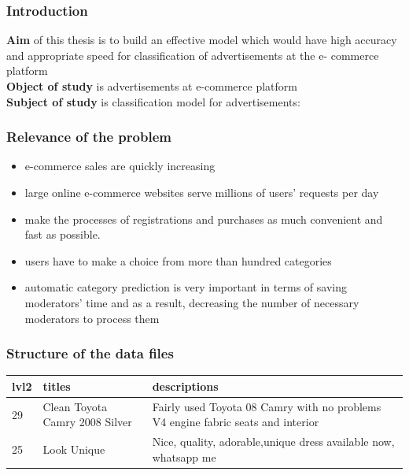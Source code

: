 \documentclass[14pt]{beamer}
\title{\small{\thesisTitle}}
\author{
		\thesisOrganizationLong\\
		\emph{Speaker:}~\thesisAuthorShort\\%
		\emph{Supervisor:}~\supervisorRegaliaShort~\supervisorFioShort\\%
	}
\date{\small{\thesisCity, \thesisYear}}
\begin{document}
		
		\maketitle

				
		\begin{frame}
			\frametitle{Introduction}
			{\textbf{Aim}} of this thesis is to build an effective model which would have
			high accuracy and appropriate speed for classification of advertisements at the e-
			commerce platform\\ 
			\textbf{Object of study} is advertisements at e-commerce platform 
			\\
			\textbf{Subject of study} is classification model for advertisements: 	
		\end{frame}
		
		\begin{frame}
			\frametitle{Relevance of the problem}
				\begin{itemize}
					\item e-commerce sales are quickly increasing
					\item large online e-commerce websites serve millions of users’ requests per day
					\item make the processes of registrations and purchases as
					much convenient and fast as possible.
					\item users have to make a choice from more than hundred categories
					\item  automatic category prediction is very important in terms of saving moderators' time and as a result, decreasing the number of necessary moderators to process them
				\end{itemize}	
		\end{frame}
		
		\begin{frame}
			\frametitle{Structure of the data files}
				\begin{table}[]
					\centering
					\begin{tabular}{|p{1cm} | p{3cm} | p{5cm} |}
						\hline
						\textbf{lvl2} & \textbf{titles}                  & \textbf{descriptions}                                                                   \\ \hline
					    29   & Clean Toyota Camry 2008 Silver   & Fairly used Toyota 08 Camry with no problems V4 engine fabric seats and interior            \\ \hline
						25   & Look Unique                      & Nice, quality, adorable,unique dress available now, whatsapp me                             \\ \hline
					\end{tabular}
				\end{table}
		\end{frame}
		
\end{document}
